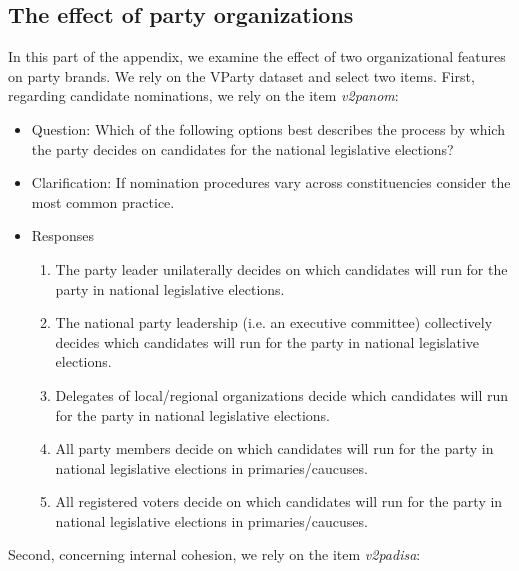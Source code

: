 \documentclass[12pt]{article}
\newcommand{\pathtables}{./tables/}
\begin{document}
\clearpage



\clearpage

\subsection{The effect of party organizations}

In this part of the appendix, we examine the effect of two organizational features on party brands. We rely on the VParty dataset and select two items. First, regarding candidate nominations, we rely on the item \textit{v2panom}: 

\begin{itemize}
  \item[]{Question: Which of the following options best describes the process by which the party decides on candidates for the national legislative elections?}
  \item[]{Clarification: If nomination procedures vary across constituencies consider the most common practice.}
  \item[]{Responses}
  \begin{enumerate}
  \item{The party leader unilaterally decides on which candidates will run for the party in national legislative elections.}
  \item{The national party leadership (i.e. an executive committee) collectively decides which candidates will run for the party in national legislative elections.}
  \item{Delegates of local/regional organizations decide which candidates will run for the party in national legislative elections.}
  \item{All party members decide on which candidates will run for the party in national legislative elections in primaries/caucuses.}
  \item{All registered voters decide on which candidates will run for the party in national legislative elections in primaries/caucuses.}
  \end{enumerate}
\end{itemize}

Second, concerning internal cohesion, we rely on the item \textit{v2padisa}:
\end{document}
